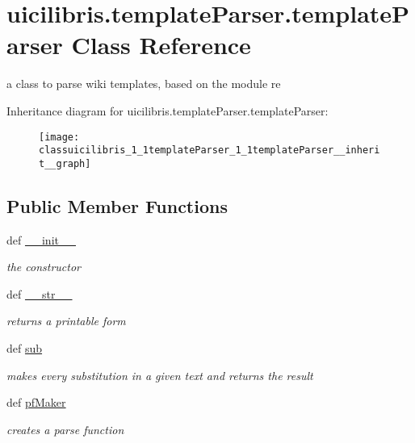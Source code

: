 \hypertarget{classuicilibris_1_1templateParser_1_1templateParser}{\section{uicilibris.\-template\-Parser.\-template\-Parser \-Class \-Reference}
\label{classuicilibris_1_1templateParser_1_1templateParser}
}


a class to parse wiki templates, based on the module re  




\-Inheritance diagram for uicilibris.\-template\-Parser.\-template\-Parser\-:
\nopagebreak
\begin{figure}[H]
\begin{center}
\leavevmode
\texttt{[image: classuicilibris\_1\_1templateParser\_1\_1templateParser\_\_inherit\_\_graph]}
\end{center}
\end{figure}
\subsection*{\-Public \-Member \-Functions}
\begin{DoxyCompactItemize}
\item 
def \hyperlink{classuicilibris_1_1templateParser_1_1templateParser_a7a2e7e96a6c5ebf16de33ca6ae66a170}{\-\_\-\-\_\-init\-\_\-\-\_\-}
\begin{DoxyCompactList}\small\item\em the constructor \end{DoxyCompactList}\item 
def \hyperlink{classuicilibris_1_1templateParser_1_1templateParser_ab8b9373fd6472e55b6478d7a5c505cbf}{\-\_\-\-\_\-str\-\_\-\-\_\-}
\begin{DoxyCompactList}\small\item\em returns a printable form \end{DoxyCompactList}\item 
def \hyperlink{classuicilibris_1_1templateParser_1_1templateParser_a850eb7385e859d86eb7d7467580b8f56}{sub}
\begin{DoxyCompactList}\small\item\em makes every substitution in a given text and returns the result \end{DoxyCompactList}\item 
def \hyperlink{classuicilibris_1_1templateParser_1_1templateParser_a48f677f123127c39f6c84eb3737e2ded}{pf\-Maker}
\begin{DoxyCompactList}\small\item\em creates a parse function \end{DoxyCompactList}\end{DoxyCompactItemize}
